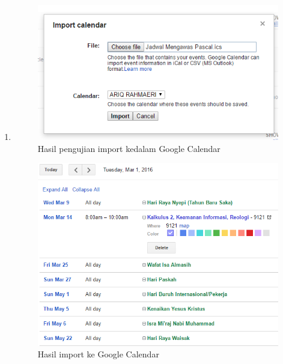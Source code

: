 \begin{enumerate}
	\item 
		\begin{figure}[H]
		\centering
		\includegraphics[scale=0.8]{Gambar/importGC}
		\caption{Hasil pengujian import kedalam Google Calendar}
		\label{fig:importGC}
		\end{figure}
		
		\begin{figure}[H]
		\centering
		\includegraphics[scale=0.7]{Gambar/hasilGC}
		\caption{Hasil import ke Google Calendar}
		\label{fig:hasilGC}
		\end{figure}
		

\end{enumerate}
